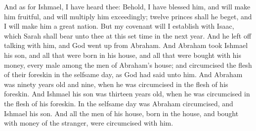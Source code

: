 \begin{biblechapter}
\verse And as for Ishmael, I have heard thee: Behold, I have blessed him, and will make him fruitful, and will multiply him exceedingly; twelve princes shall he beget, and I will make him a great nation.
\verse But my covenant will I establish with Isaac, which Sarah shall bear unto thee at this set time in the next year.
\verse And he left off talking with him, and God went up from Abraham.
\verse And Abraham took Ishmael his son, and all that were born in his house, and all that were bought with his money, every male among the men of Abraham's house; and circumcised the flesh of their foreskin in the selfsame day, as God had said unto him.
\verse And Abraham was ninety years old and nine, when he was circumcised in the flesh of his foreskin.
\verse And Ishmael his son was thirteen years old, when he was circumcised in the flesh of his foreskin.
\verse In the selfsame day was Abraham circumcised, and Ishmael his son.
\verse And all the men of his house, born in the house, and bought with money of the stranger, were circumcised with him.
\end{biblechapter}

